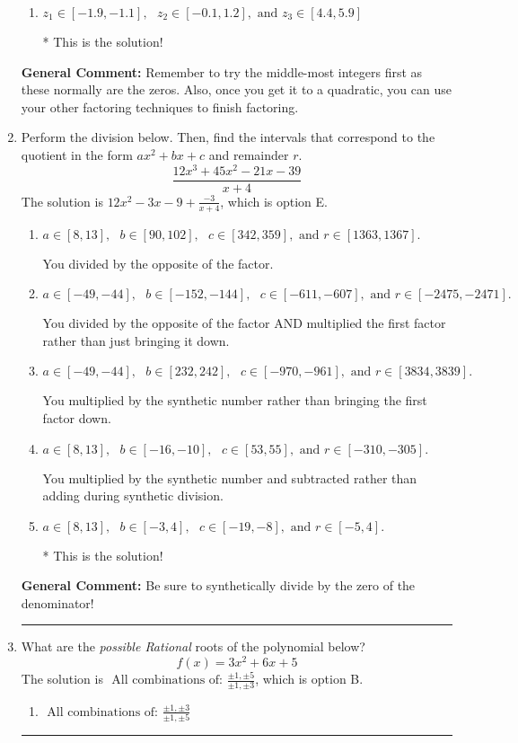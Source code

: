 \documentclass{extbook}[14pt]
\newcommand{\litem}[1]{\item #1

\rule{\textwidth}{0.4pt}}
\begin{document}
\begin{enumerate}
{\begin{enumerate}[label=\Alph*.]
 Distractor 2: Corresponds to inversing rational roots.
\item \( z_1 \in [-1.9, -1.1], \text{   }  z_2 \in [-0.1, 1.2], \text{   and   } z_3 \in [4.4, 5.9] \)

* This is the solution!
\end{enumerate}

\textbf{General Comment:} Remember to try the middle-most integers first as these normally are the zeros. Also, once you get it to a quadratic, you can use your other factoring techniques to finish factoring.
}
\litem{
Perform the division below. Then, find the intervals that correspond to the quotient in the form $ax^2+bx+c$ and remainder $r$.
\[ \frac{12x^{3} +45 x^{2} -21 x -39}{x + 4} \]The solution is \( 12x^{2} -3 x -9 + \frac{-3}{x + 4} \), which is option E.\begin{enumerate}[label=\Alph*.]
\item \( a \in [8, 13], \text{   } b \in [90, 102], \text{   } c \in [342, 359], \text{   and   } r \in [1363, 1367]. \)

 You divided by the opposite of the factor.
\item \( a \in [-49, -44], \text{   } b \in [-152, -144], \text{   } c \in [-611, -607], \text{   and   } r \in [-2475, -2471]. \)

 You divided by the opposite of the factor AND multiplied the first factor rather than just bringing it down.
\item \( a \in [-49, -44], \text{   } b \in [232, 242], \text{   } c \in [-970, -961], \text{   and   } r \in [3834, 3839]. \)

 You multiplied by the synthetic number rather than bringing the first factor down.
\item \( a \in [8, 13], \text{   } b \in [-16, -10], \text{   } c \in [53, 55], \text{   and   } r \in [-310, -305]. \)

 You multiplied by the synthetic number and subtracted rather than adding during synthetic division.
\item \( a \in [8, 13], \text{   } b \in [-3, 4], \text{   } c \in [-19, -8], \text{   and   } r \in [-5, 4]. \)

* This is the solution!
\end{enumerate}

\textbf{General Comment:} Be sure to synthetically divide by the zero of the denominator!
}
\litem{
What are the \textit{possible Rational} roots of the polynomial below?
\[ f(x) = 3x^{2} +6 x + 5 \]The solution is \( \text{ All combinations of: }\frac{\pm 1,\pm 5}{\pm 1,\pm 3} \), which is option B.\begin{enumerate}[label=\Alph*.]
\item \( \text{ All combinations of: }\frac{\pm 1,\pm 3}{\pm 1,\pm 5} \)


\end{enumerate}}
\end{enumerate}
\end{document}
